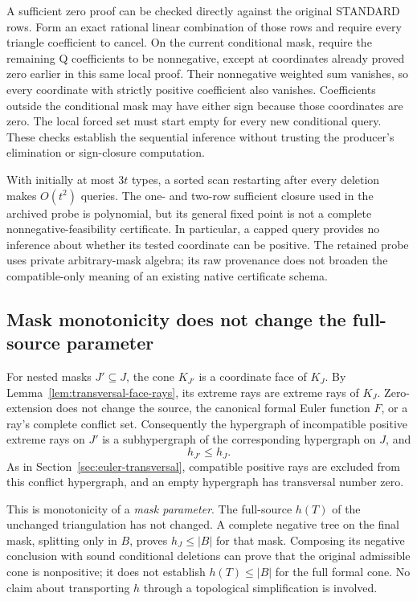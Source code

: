 A sufficient zero proof can be checked directly against the original
STANDARD rows.  Form an exact rational linear combination of those rows
and require every triangle coefficient to cancel.  On the current
conditional mask, require the remaining Q coefficients to be nonnegative,
except at coordinates already proved zero earlier in this same local
proof.  Their nonnegative weighted sum vanishes, so every coordinate
with strictly positive coefficient also vanishes.  Coefficients outside
the conditional mask may have either sign because those coordinates are
zero.  The local forced set must start empty for every new conditional
query.  These checks establish the sequential inference without trusting
the producer's elimination or sign-closure computation.

With initially at most $3t$ types, a sorted scan restarting after every
deletion makes $O(t^2)$ queries.  The one- and two-row sufficient closure
used in the archived probe is polynomial, but its general fixed point is
not a complete nonnegative-feasibility certificate.  In particular, a
capped query provides no inference about whether its tested coordinate
can be positive.  The retained probe uses private arbitrary-mask algebra;
its raw provenance does not broaden the compatible-only meaning of an
existing native certificate schema.

\subsection{Mask monotonicity does not change the full-source parameter}

For nested masks $J'\subseteq J$, the cone $K_{J'}$ is a coordinate face
of $K_J$.  By Lemma~\ref{lem:transversal-face-rays}, its extreme rays are
extreme rays of $K_J$.  Zero-extension does not change the source, the
canonical formal Euler function $F$, or a ray's complete conflict set.
Consequently the hypergraph of incompatible positive extreme rays on
$J'$ is a subhypergraph of the corresponding hypergraph on $J$, and
\[
                              h_{J'}\le h_J.
\]
As in Section~\ref{sec:euler-transversal}, compatible positive rays are
excluded from this conflict hypergraph, and an empty hypergraph has
transversal number zero.

This is monotonicity of a \emph{mask parameter}.  The full-source $h(T)$
of the unchanged triangulation has not changed.  A complete negative
tree on the final mask, splitting only in $B$, proves $h_J\le |B|$ for
that mask.  Composing its negative conclusion with sound conditional
deletions can prove that the original admissible cone is nonpositive;
it does not establish $h(T)\le |B|$ for the full formal cone.  No claim
about transporting $h$ through a topological simplification is involved.

